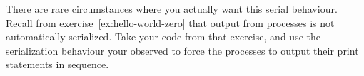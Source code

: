   There are rare circumstances where you actually want this serial
  behaviour. Recall from exercise~\ref{ex:hello-world-zero} that
  output from processes is not automatically serialized. Take your
  code from that exercise, and use the serialization behaviour your
  observed to force the processes to output their print statements in
  sequence.
